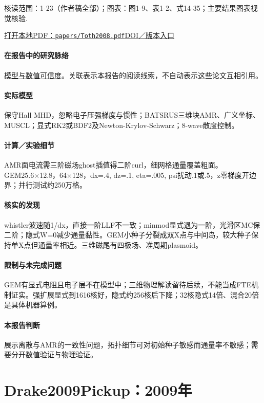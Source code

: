 \documentclass[UTF8,a4paper,11pt,openany,fontset=fandol]{ctexbook}
\begin{document}
\textsf{核读范围：}1-23（作者稿全部）；\textsf{图表：}图1-9、表1-2、式14-35；主要结果图表视觉核验.

\href{run:../papers/Toth2008.pdf}{打开本地PDF：\texttt{papers/Toth2008.pdf}}\quad\href{https://doi.org/10.1016/j.jcp.2008.04.010}{DOI／版本入口}

\paragraph{在报告中的研究脉络}\hyperref[V1-ch:numerics]{模型与数值可信度}。关联表示本报告的阅读线索，不自动表示这些论文互相引用。

\paragraph{实际模型}保守Hall MHD，忽略电子压强梯度与惯性；BATSRUS三维块AMR、广义坐标、MUSCL；显式RK2或BDF2及Newton-Krylov-Schwarz；8-wave散度控制。

\paragraph{计算／实验细节}AMR面电流需三阶磁场ghost插值得二阶curl，细网格通量覆盖粗面。GEM25.6×12.8，64×128，dx=.4, dz=.1, eta=.005, psi扰动.1或.5，z零梯度开边界；并行测试约250万格。

\paragraph{核实的发现}whistler波速随1/dx，直接一阶LLF不一致；minmod显式退为一阶，光滑区MC保二阶；隐式W=0减少通量黏性。GEM小种子分裂成双X点与中间岛，较大种子保持单X点但通量率相近。三维磁尾有四极场、准周期plasmoid。

\paragraph{限制与未完成问题}GEM有显式电阻且电子层不在模型中；三维物理解读留待后续，不能当成FTE机制证实。强扩展显式到1616核好，隐式约256核后下降；32核隐式14倍、混合20倍是具体机器算例。

\paragraph{本报告判断}展示离散与AMR的一致性问题，拓扑细节可对初始种子敏感而通量率不敏感；需要分开数值验证与物理验证。

\section{Drake2009Pickup：2009年}\label{paper:Drake2009Pickup}
\end{document}

